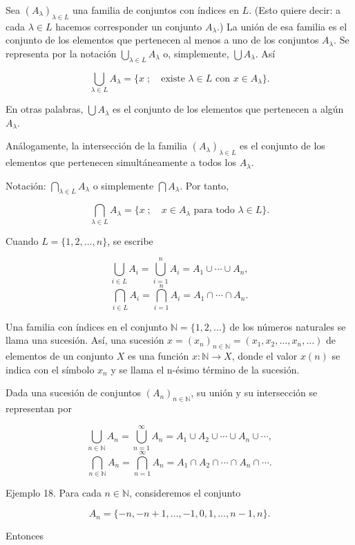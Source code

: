 Sea \((A_\lambda)_{\lambda \in L}\) una familia de conjuntos con índices en \(L\). (Esto quiere decir: a cada \(\lambda \in L\) hacemos corresponder un conjunto \(A_\lambda\).) La unión de esa familia es el conjunto de los elementos que pertenecen al menos a uno de los conjuntos \(A_\lambda\). Se representa por la notación \(\bigcup_{\lambda \in L} A_\lambda\) o, simplemente, \(\bigcup A_\lambda\). Así

\[
\bigcup_{\lambda \in L} A_\lambda = \{x \; ; \quad \text{existe } \lambda \in L \text{ con } x \in A_\lambda\}.
\]

En otras palabras, \(\bigcup A_\lambda\) es el conjunto de los elementos que pertenecen a algún \(A_\lambda\).

Análogamente, la intersección de la familia \((A_\lambda)_{\lambda \in L}\) es el conjunto de los elementos que pertenecen simultáneamente a todos los \(A_\lambda\).

Notación: \(\bigcap_{\lambda \in L} A_\lambda\) o simplemente \(\bigcap A_\lambda\). Por tanto,

\[
\bigcap_{\lambda \in L} A_\lambda = \{x \; ; \quad x \in A_\lambda \text{ para todo } \lambda \in L\}.
\]

Cuando \(L = \{1, 2, \dots, n\}\), se escribe

\[
\bigcup_{i \in L} A_i = \bigcup_{i=1}^n A_i = A_1 \cup \cdots \cup A_n,
\]
\[
\bigcap_{i \in L} A_i = \bigcap_{i=1}^n A_i = A_1 \cap \cdots \cap A_n.
\]

Una familia con índices en el conjunto \(\mathbb{N} = \{1, 2, \dots\}\) de los números naturales se llama una sucesión. Así, una sucesión \(x = (x_n)_{n \in \mathbb{N}} = (x_1, x_2, \dots, x_n, \dots)\) de elementos de un conjunto \(X\) es una función \(x: \mathbb{N} \to X\), donde el valor \(x(n)\) se indica con el símbolo \(x_n\) y se llama el n-ésimo término de la sucesión.

Dada una sucesión de conjuntos \((A_n)_{n \in \mathbb{N}}\), su unión y su intersección se representan por

\[
\bigcup_{n \in \mathbb{N}} A_n = \bigcup_{n=1}^\infty A_n = A_1 \cup A_2 \cup \cdots \cup A_n \cup \cdots,
\]
\[
\bigcap_{n \in \mathbb{N}} A_n = \bigcap_{n=1}^\infty A_n = A_1 \cap A_2 \cap \cdots \cap A_n \cap \cdots.
\]

Ejemplo 18. Para cada \(n \in \mathbb{N}\), consideremos el conjunto

\[
A_n = \{-n, -n+1, \dots, -1, 0, 1, \dots, n-1, n\}.
\]

Entonces

